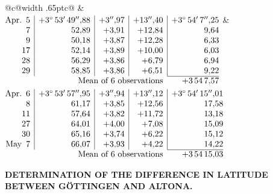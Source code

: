 \noindent\begin{tabular}{@{}c@{\hspace{.4em}\vrule width .65pt\hspace{.4em}}c@{}}
 &
 \\[.18ex]
\(\begin{array}[t]{@{}r|r|r|r|r@{}}
\text{Apr.}\enspace 5 & +3^\circ\,53'\,49''{,}88 & +3''{,}97 & +13''{,}40 & +3^\circ\,54'\,7''{,}25\\
7 & 52{,}89 & +3{,}91 & +12{,}84 & 9{,}64\\
9 & 50{,}18 & +3{,}87 & +12{,}28 & 6{,}33\\
17 & 52{,}14 & +3{,}89 & +10{,}00 & 6{,}03\\
28 & 56{,}29 & +3{,}86 & +6{,}79 & 6{,}94\\
29 & 58{,}85 & +3{,}86 & +6{,}51 & 9{,}22\\
\cline{5-5}
\multicolumn{4}{r}{\text{Mean of 6 observations}} & +3\,54\,7{,}57
\end{array}\)
&
\(\begin{array}[t]{@{}r|r|r|r|r@{}}
\text{Apr.}\enspace 6 & +3^\circ\,53'\,57''{,}95 & +3''{,}94 & +13''{,}12 & +3^\circ\,54'\,15''{,}01\\
8 & 61{,}17 & +3{,}85 & +12{,}56 & 17{,}58\\
11 & 57{,}64 & +3{,}82 & +11{,}72 & 13{,}18\\
27 & 64{,}01 & +4{,}00 & +7{,}08 & 15{,}09\\
30 & 65{,}16 & +3{,}74 & +6{,}22 & 15{,}12\\
\text{May}\enspace 7 & 66{,}07 & +3{,}93 & +4{,}22 & 14{,}22\\
\cline{5-5}
\multicolumn{4}{r}{\text{Mean of 6 observations}} & +3\,54\,15{,}03
\end{array}\)
\end{tabular}\par\medskip

\par\clearpage
\noindent{}\parbox[t]{\dimexpr\linewidth-24mm\relax}{\centering\scriptsize\bfseries DETERMINATION OF THE DIFFERENCE IN LATITUDE BETWEEN GÖTTINGEN AND ALTONA.}\makebox[12mm][r]{}\par\medskip

